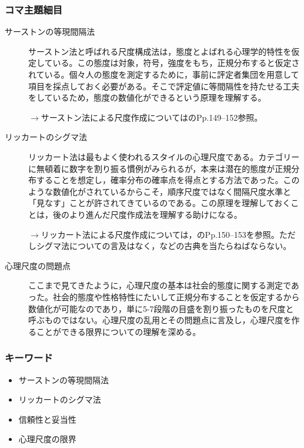 \subsubsection{コマ主題細目}
\begin{description}
	\item[サーストンの等現間隔法]サーストン法と呼ばれる尺度構成法は，態度とよばれる心理学的特性を仮定している。この態度は対象，符号，強度をもち，正規分布すると仮定されている。個々人の態度を測定するために，事前に評定者集団を用意して項目を採点しておく必要がある。そこで評定値に等間隔性を持たせる工夫をしているため，態度の数値化ができるという原理を理解する。
	      \begin{flushright}
		      $\to$サーストン法による尺度作成については\textcite{Suenaga1987}のPp.149--152参照。
	      \end{flushright}

	\item[リッカートのシグマ法]リッカート法は最もよく使われるスタイルの心理尺度である。カテゴリーに無頓着に数字を割り振る慣例がみられるが，本来は潜在的態度が正規分布することを想定し，確率分布の確率点を得点とする方法であった。このような数値化がされているからこそ，順序尺度ではなく間隔尺度水準と「見なす」ことが許されてきているのである。この原理を理解しておくことは，後のより進んだ尺度作成法を理解する助けになる。

	      \begin{flushright}
		      $\to$リッカート法による尺度作成については，\textcite{Miyatani2009}のPp.150--153を参照。ただしシグマ法についての言及はなく，\textcite{Tanaka197701}などの古典を当たらねばならない。
	      \end{flushright}
	
	\item[心理尺度の問題点] ここまで見てきたように，心理尺度の基本は社会的態度に関する測定であった。社会的態度や性格特性にたいして正規分布することを仮定するから数値化が可能なのであり，単に5-7段階の目盛を割り振ったものを尺度と呼ぶものではない。心理尺度の乱用とその問題点に言及し，心理尺度を作ることができる限界についての理解を深める。

\end{description}
\subsubsection{キーワード}
\begin{itemize}
	\item サーストンの等現間隔法
	\item リッカートのシグマ法
	\item 信頼性と妥当性
	\item 心理尺度の限界
\end{itemize}
